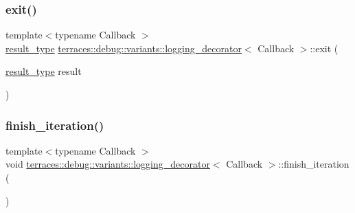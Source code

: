 \mbox{\label{classterraces_1_1debug_1_1variants_1_1logging__decorator_a8279aabed27469c45219527121f5948b}} 
\subsubsection{\texorpdfstring{exit()}{exit()}}
{\footnotesize\ttfamily template$<$typename Callback $>$ \\
\hyperlink{classterraces_1_1debug_1_1variants_1_1logging__decorator_a7c08c8ede1f8c884a3bab0437b244f55}{result\+\_\+type} \hyperlink{classterraces_1_1debug_1_1variants_1_1logging__decorator}{terraces\+::debug\+::variants\+::logging\+\_\+decorator}$<$ Callback $>$\+::exit (\begin{DoxyParamCaption}\item[{\hyperlink{classterraces_1_1debug_1_1variants_1_1logging__decorator_a7c08c8ede1f8c884a3bab0437b244f55}{result\+\_\+type}}]{result }\end{DoxyParamCaption})\hspace{0.3cm}{\ttfamily [inline]}}

\mbox{\label{classterraces_1_1debug_1_1variants_1_1logging__decorator_aed1d3afe4d25a5b08be18c8576b98dd8}} 
\subsubsection{\texorpdfstring{finish\+\_\+iteration()}{finish\_iteration()}}
{\footnotesize\ttfamily template$<$typename Callback $>$ \\
void \hyperlink{classterraces_1_1debug_1_1variants_1_1logging__decorator}{terraces\+::debug\+::variants\+::logging\+\_\+decorator}$<$ Callback $>$\+::finish\+\_\+iteration (\begin{DoxyParamCaption}{ }\end{DoxyParamCaption})\hspace{0.3cm}{\ttfamily [inline]}}


